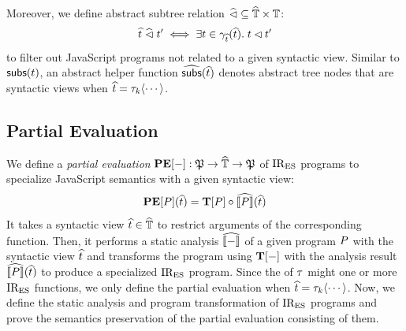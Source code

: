 % 
% 
% 
Moreover, we define abstract subtree relation $\widehat{\lhd} \subseteq \widehat{\mathbb{T}}
\times \mathbb{T}$:
\[
  \widehat{t} \; \widehat{\lhd} \; t' \iff \exists t \in \gamma_{\widehat{t}}(\widehat{t}). \;
  t \lhd t'
\]
to filter out JavaScript programs not related to a given syntactic view.
Similar to $\textsf{subs}(t)$, an abstract helper function $\widehat{\textsf{subs}}(\widehat{t})$
denotes abstract tree nodes that are syntactic views when $\widehat{t} = \tau_k
\langle \cdots \rangle$.



\subsection{Partial Evaluation}

We define a \textit{partial evaluation} $\textbf{PE}[-]: \mathfrak{P} \rightarrow
\widehat{\mathbb{T}} \rightarrow \mathfrak{P}$ of $\text{IR}_\text{ES}$ programs to specialize JavaScript
semantics with a given syntactic view:
\[
  \textbf{PE}[P](\widehat{t}) = \textbf{T}[P] \circ \widehat{\llbracket{P}\rrbracket} (\widehat{t})
\]
It takes a syntactic view $\widehat{t} \in \widehat{\mathbb{T}}$ to restrict arguments of the
corresponding  function. Then, it performs a static analysis
$\widehat{\llbracket{-}\rrbracket}$ of a given program $P$ with the syntactic view $\widehat{t}$ and
transforms the program using $\textbf{T}[-]$ with the analysis result
$\widehat{\llbracket{P}\rrbracket}(\widehat{t})$ to produce a specialized $\text{IR}_\text{ES}$ program.  Since the
 of $\tau$ might one or more $\text{IR}_\text{ES}$ functions, we only define
the partial evaluation when $\widehat{t} = \tau_k \langle \cdots \rangle$.  Now, we
define the static analysis and program transformation of $\text{IR}_\text{ES}$ programs and
prove the semantics preservation of the partial evaluation consisting of them.


